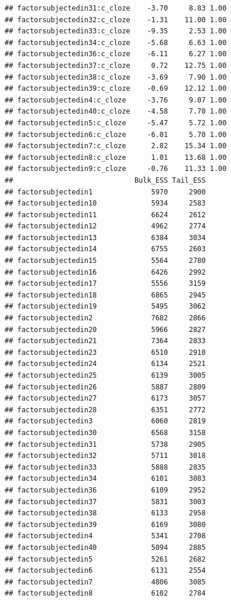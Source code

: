 \documentclass[12pt,ignorenonframetext,aspectratio=169]{beamer}
\begin{document}
\begin{frame}[fragile]
\begin{verbatim}
## factorsubjectedin31:c_cloze    -3.70     8.83 1.00
## factorsubjectedin32:c_cloze    -1.31    11.00 1.00
## factorsubjectedin33:c_cloze    -9.35     2.53 1.00
## factorsubjectedin34:c_cloze    -5.68     6.63 1.00
## factorsubjectedin36:c_cloze    -6.11     6.27 1.00
## factorsubjectedin37:c_cloze     0.72    12.75 1.00
## factorsubjectedin38:c_cloze    -3.69     7.90 1.00
## factorsubjectedin39:c_cloze    -0.69    12.12 1.00
## factorsubjectedin4:c_cloze     -3.76     9.07 1.00
## factorsubjectedin40:c_cloze    -4.58     7.70 1.00
## factorsubjectedin5:c_cloze     -5.47     5.72 1.00
## factorsubjectedin6:c_cloze     -6.01     5.70 1.00
## factorsubjectedin7:c_cloze      2.82    15.34 1.00
## factorsubjectedin8:c_cloze      1.01    13.68 1.00
## factorsubjectedin9:c_cloze     -0.76    11.33 1.00
##                             Bulk_ESS Tail_ESS
## factorsubjectedin1              5970     2900
## factorsubjectedin10             5934     2583
## factorsubjectedin11             6624     2612
## factorsubjectedin12             4962     2774
## factorsubjectedin13             6384     3034
## factorsubjectedin14             6755     2603
## factorsubjectedin15             5564     2780
## factorsubjectedin16             6426     2992
## factorsubjectedin17             5556     3159
## factorsubjectedin18             6865     2945
## factorsubjectedin19             5495     3062
## factorsubjectedin2              7682     2866
## factorsubjectedin20             5966     2827
## factorsubjectedin21             7364     2833
## factorsubjectedin23             6510     2910
## factorsubjectedin24             6134     2521
## factorsubjectedin25             6139     3005
## factorsubjectedin26             5887     2809
## factorsubjectedin27             6173     3057
## factorsubjectedin28             6351     2772
## factorsubjectedin3              6060     2819
## factorsubjectedin30             6568     3158
## factorsubjectedin31             5738     2905
## factorsubjectedin32             5711     3018
## factorsubjectedin33             5888     2835
## factorsubjectedin34             6101     3083
## factorsubjectedin36             6109     2952
## factorsubjectedin37             5831     3003
## factorsubjectedin38             6133     2958
## factorsubjectedin39             6169     3080
## factorsubjectedin4              5341     2708
## factorsubjectedin40             5094     2885
## factorsubjectedin5              5261     2682
## factorsubjectedin6              6131     2554
## factorsubjectedin7              4806     3085
## factorsubjectedin8              6102     2784

\end{verbatim}
\end{frame}
\end{document}
